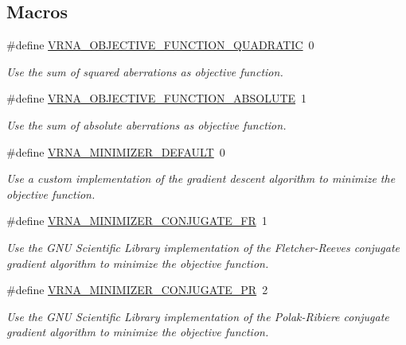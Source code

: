 \subsection*{Macros}
\begin{DoxyCompactItemize}
\item 
\#define \hyperlink{group__perturbation_ga81e10993d1ae728e4e02022b33155a12}{V\+R\+N\+A\+\_\+\+O\+B\+J\+E\+C\+T\+I\+V\+E\+\_\+\+F\+U\+N\+C\+T\+I\+O\+N\+\_\+\+Q\+U\+A\+D\+R\+A\+T\+IC}~0
\begin{DoxyCompactList}\small\item\em Use the sum of squared aberrations as objective function. \end{DoxyCompactList}\item 
\#define \hyperlink{group__perturbation_gac070dfb9cafaeb14d5652bd9adf0f6b1}{V\+R\+N\+A\+\_\+\+O\+B\+J\+E\+C\+T\+I\+V\+E\+\_\+\+F\+U\+N\+C\+T\+I\+O\+N\+\_\+\+A\+B\+S\+O\+L\+U\+TE}~1
\begin{DoxyCompactList}\small\item\em Use the sum of absolute aberrations as objective function. \end{DoxyCompactList}\item 
\mbox{\label{group__perturbation_gae5126200d80dbb282f46083fffc606bf}} 
\#define \hyperlink{group__perturbation_gae5126200d80dbb282f46083fffc606bf}{V\+R\+N\+A\+\_\+\+M\+I\+N\+I\+M\+I\+Z\+E\+R\+\_\+\+D\+E\+F\+A\+U\+LT}~0
\begin{DoxyCompactList}\small\item\em Use a custom implementation of the gradient descent algorithm to minimize the objective function. \end{DoxyCompactList}\item 
\#define \hyperlink{group__perturbation_gab1d89db58e8c497795a5005f5dbc8c4a}{V\+R\+N\+A\+\_\+\+M\+I\+N\+I\+M\+I\+Z\+E\+R\+\_\+\+C\+O\+N\+J\+U\+G\+A\+T\+E\+\_\+\+FR}~1
\begin{DoxyCompactList}\small\item\em Use the G\+NU Scientific Library implementation of the Fletcher-\/\+Reeves conjugate gradient algorithm to minimize the objective function. \end{DoxyCompactList}\item 
\#define \hyperlink{group__perturbation_ga5aaeafe1b0aa77a5cda18943ff94b02f}{V\+R\+N\+A\+\_\+\+M\+I\+N\+I\+M\+I\+Z\+E\+R\+\_\+\+C\+O\+N\+J\+U\+G\+A\+T\+E\+\_\+\+PR}~2
\begin{DoxyCompactList}\small\item\em Use the G\+NU Scientific Library implementation of the Polak-\/\+Ribiere conjugate gradient algorithm to minimize the objective function. \end{DoxyCompactList}\item 

\end{DoxyCompactItemize}
